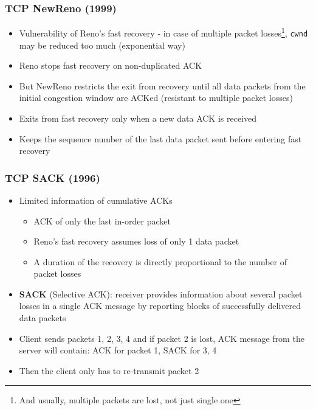 \subsubsection{TCP NewReno (1999)}
\begin{itemize}
	\item Vulnerability of Reno's fast recovery - in case of multiple packet losses\footnote{And usually, multiple packets are lost, not just single one}, \texttt{cwnd} may be reduced too much (exponential way)
	\item Reno stops fast recovery on non-duplicated ACK
	\item But NewReno restricts the exit from recovery until all data packets from the initial congestion window are ACKed (resistant to multiple packet losses)
	\item Exits from fast recovery only when a new data ACK is received
	\item Keeps the sequence number of the last data packet sent before entering fast recovery	
\end{itemize}

\subsubsection{TCP SACK (1996)}
\begin{itemize}
	\item Limited information of cumulative ACKs
	\begin{itemize}
		\item ACK of only the last in-order packet
		\item Reno's fast recovery assumes loss of only 1 data packet
		\item A duration of the recovery is directly proportional to the number of packet losses
	\end{itemize}
	\item \textbf{SACK} (Selective ACK): receiver provides information about several packet losses in a single ACK message by reporting blocks of successfully delivered data packets
	\item Client sends packets 1, 2, 3, 4 and if packet 2 is lost, ACK message from the server will contain: ACK for packet 1, SACK for 3, 4
	\item Then the client only has to re-transmit packet 2
\end{itemize}

